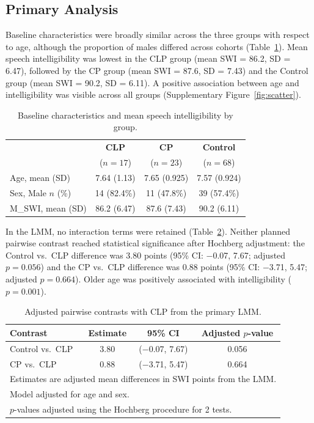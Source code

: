 \documentclass[11pt]{article}
\begin{document}
\subsection*{Primary Analysis}\label{sec:res-primary}
Baseline characteristics were broadly similar across the three groups with
respect to age, although the proportion of males differed across cohorts
(Table~\ref{tab:baseline}). Mean speech intelligibility was lowest in the CLP
group (mean SWI = 86.2, SD = 6.47), followed by the CP group (mean SWI =
87.6, SD = 7.43) and the Control group (mean SWI = 90.2, SD = 6.11). A
positive association between age and intelligibility was visible across all
groups (Supplementary Figure~\ref{fig:scatter}).

\begin{table}[H]
\centering
\caption{Baseline characteristics and mean speech intelligibility by group.}
\label{tab:baseline}
\begin{tabular}{lccc}
\toprule
& \textbf{CLP} & \textbf{CP} & \textbf{Control} \\
& ($n=17$) & ($n=23$) & ($n=68$) \\
\midrule
Age, mean (SD)      & 7.64 (1.13) & 7.65 (0.925) & 7.57 (0.924) \\[0.5em]
Sex, Male $n$ (\%)  & 14 (82.4\%) & 11 (47.8\%)  & 39 (57.4\%)  \\[0.5em]
M\_SWI, mean (SD)   & 86.2 (6.47) & 87.6 (7.43)  & 90.2 (6.11)  \\
\bottomrule
\end{tabular}
\end{table}

In the LMM, no interaction terms were retained (Table~\ref{tab:primary}).
Neither planned pairwise contrast reached statistical significance after
Hochberg adjustment: the Control vs.\ CLP difference was 3.80 points
(95\% CI: $-$0.07, 7.67; adjusted $p = 0.056$) and the CP vs.\ CLP
difference was 0.88 points (95\% CI: $-$3.71, 5.47; adjusted $p = 0.664$).
Older age was positively associated with intelligibility ($p = 0.001$).

\begin{table}[H]
\centering
\caption{Adjusted pairwise contrasts with CLP from the primary LMM.}
\label{tab:primary}
\begin{tabular}{lccc}
\toprule
\textbf{Contrast} & \textbf{Estimate} & \textbf{95\% CI} & \textbf{Adjusted $p$-value} \\
\midrule
Control vs.\ CLP & 3.80 & ($-$0.07, 7.67) & 0.056 \\[0.5em]
CP vs.\ CLP      & 0.88 & ($-$3.71, 5.47) & 0.664 \\
\bottomrule
\multicolumn{4}{l}{\footnotesize Estimates are adjusted mean differences in SWI points from the LMM.} \\
\multicolumn{4}{l}{\footnotesize Model adjusted for age and sex.} \\
\multicolumn{4}{l}{\footnotesize $p$-values adjusted using the Hochberg procedure for 2 tests.} \\
\end{tabular}
\end{table}
\end{document}
